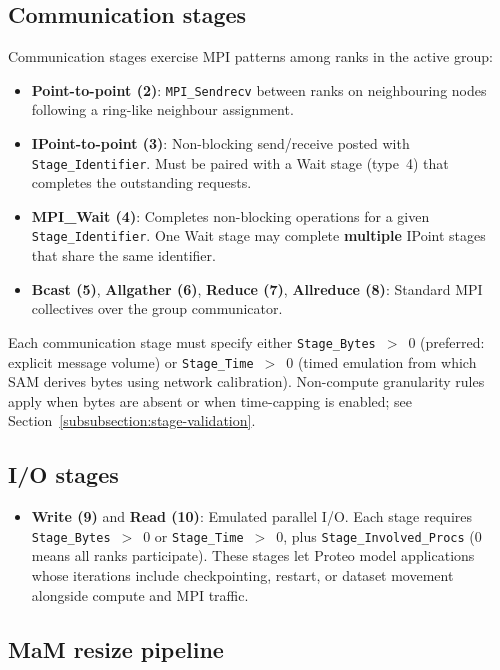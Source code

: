 \subsection{Communication stages}
\label{subsection:comm-stages}

Communication stages exercise MPI patterns among ranks in the active group:

\begin{itemize}
  \item \textbf{Point-to-point (2)}: \texttt{MPI\_Sendrecv} between ranks on neighbouring nodes following a ring-like neighbour assignment.
  \item \textbf{IPoint-to-point (3)}: Non-blocking send/receive posted with \texttt{Stage\_Identifier}. Must be paired with a Wait stage (type~4) that completes the outstanding requests.
  \item \textbf{MPI\_Wait (4)}: Completes non-blocking operations for a given \texttt{Stage\_Identifier}. One Wait stage may complete \textbf{multiple} IPoint stages that share the same identifier.
  \item \textbf{Bcast (5)}, \textbf{Allgather (6)}, \textbf{Reduce (7)}, \textbf{Allreduce (8)}: Standard MPI collectives over the group communicator.
\end{itemize}

Each communication stage must specify either \texttt{Stage\_Bytes}~$>$~0 (preferred: explicit message volume) or \texttt{Stage\_Time}~$>$~0 (timed emulation from which SAM derives bytes using network calibration). Non-compute granularity rules apply when bytes are absent or when time-capping is enabled; see Section~\ref{subsubsection:stage-validation}.

\subsection{I/O stages}
\label{subsection:io-stages}

\begin{itemize}
  \item \textbf{Write (9)} and \textbf{Read (10)}: Emulated parallel I/O. Each stage requires \texttt{Stage\_Bytes}~$>$~0 or \texttt{Stage\_Time}~$>$~0, plus \texttt{Stage\_Involved\_Procs} ($0$ means all ranks participate). These stages let Proteo model applications whose iterations include checkpointing, restart, or dataset movement alongside compute and MPI traffic.
\end{itemize}

\subsection{MaM resize pipeline}
\label{subsection:mam-resize}


